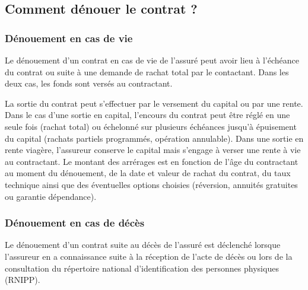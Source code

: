 \documentclass{article}
\begin{document}
\subsection{Comment dénouer le contrat ?}
\subsubsection{Dénouement en cas de vie}
Le dénouement d'un contrat en cas de vie de l'assuré peut avoir lieu à l'échéance du contrat ou suite à une demande de rachat total par le contactant. Dans les deux cas, les fonds sont versés au contractant.

La sortie du contrat peut s'effectuer par le versement du capital ou par une rente. Dans le cas d'une sortie en capital, l'encours du contrat peut être réglé en une seule fois (rachat total) ou échelonné sur plusieurs échéances  jusqu'à épuisement du capital (rachats partiels programmés, opération annulable). Dans une sortie en rente viagère, l'assureur conserve le capital mais s'engage à verser une rente à vie au contractant. Le montant des arrérages est en fonction de l'âge du contractant au moment du dénouement, de la date et valeur de rachat du contrat, du taux technique ainsi que des éventuelles options choisies (réversion, annuités gratuites ou garantie dépendance).

\subsubsection{Dénouement en cas de décès}
Le dénouement d'un contrat suite au décès de l'assuré est déclenché lorsque l'assureur en a connaissance suite à la réception de l'acte de décès ou lors de la consultation du répertoire national d'identification des personnes physiques (RNIPP).

\end{document}
